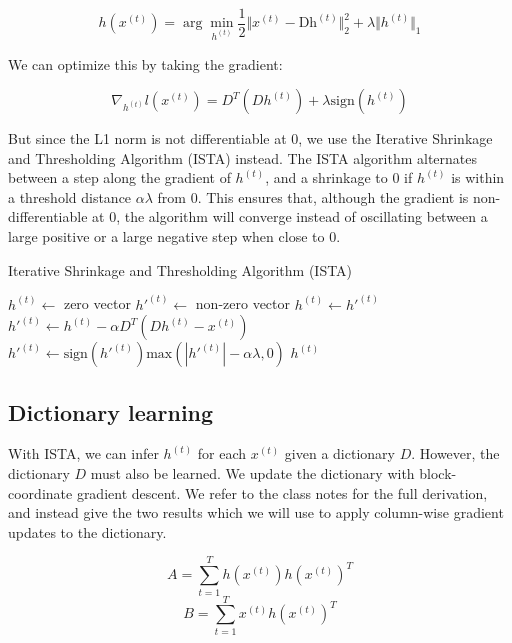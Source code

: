 \documentclass{article} %
\begin{document}
\begin{equation}
h(x^{(t)}) = \arg\min_{h^{(t)}} \frac{1}{2} \Vert x^{(t)} - \text{D} \text{h}^{(t)} \Vert_{2}^{2} + \lambda \Vert h^{(t)} \Vert_{1}
\end{equation}

We can optimize this by taking the gradient:

\begin{equation}
\nabla_{h^{(t)}} l (x^{(t)}) = D^T(D h^{(t)}) + \lambda \text{sign} (h^{(t)})
\end{equation}

But since the L1 norm is not differentiable at 0, we use the Iterative Shrinkage and Thresholding Algorithm (ISTA) instead. The ISTA algorithm alternates between a step along the gradient of $h^{(t)}$, and a shrinkage to $0$ if $h^{(t)}$ is within a threshold distance $\alpha\lambda$ from $0$. This ensures that, although the gradient is non-differentiable at 0, the algorithm will converge instead of oscillating between a large positive or a large negative step when close to $0$.

\begin{algorithm}
\caption{Iterative Shrinkage and Thresholding Algorithm (ISTA)}
\begin{algorithmic}[1]
\State $h^{(t)}\gets $ zero vector
\State $h'^{(t)}\gets $ non-zero vector 
	\State $h^{(t)}\gets h'^{(t)}$
	\State $h'^{(t)}\gets h^{(t)} - \alpha D^T(Dh^{(t)} - x^{(t)})$ 
	\State $h'^{(t)}\gets \text{sign}(h'^{(t)}) \text{max}(|h'^{(t)}| - \alpha\lambda, 0)$ 
\EndWhile
\State\Return $h^{(t)}$
\end{algorithmic}
\end{algorithm}

\subsection{Dictionary learning}
With ISTA, we can infer $h^{(t)}$ for each $x^{(t)}$ given a dictionary $D$. However, the dictionary $D$ must also be learned. We update the dictionary with block-coordinate gradient descent. We refer to the class notes for the full derivation, and instead give the two results which we will use to apply column-wise gradient updates to the dictionary.

\begin{equation}
A = \sum_{t=1}^T h(x^{(t)}) h(x^{(t)})^T
\end{equation}
\begin{equation}
B = \sum_{t=1}^T x^{(t)} h(x^{(t)})^T
\end{equation}
\end{document}
